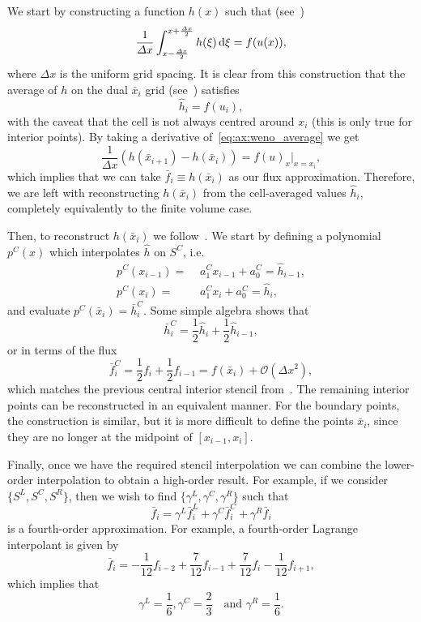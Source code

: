 \documentclass{scrartcl}
\begin{document}
We start by constructing a function $h(x)$ such that (see~\cite[Section 3.2]{Shu2009})
\begin{equation} \label{eq:ax:weno_average}
\frac{1}{\Delta x} \int_{x - \frac{\Delta x}{2}}^{x + \frac{\Delta x}{2}}
    h(\xi) \dx[\xi] = f(u(x)),
\end{equation}
where $\Delta x$ is the uniform grid spacing. It is clear from this construction
that the average of $h$ on the dual $\bar{x}_i$ grid (see~) satisfies
\[
\hat{h}_i = f(u_i),
\]
with the caveat that the cell is not always centred around $x_i$ (this is only
true for interior points). By taking a derivative of~\eqref{eq:ax:weno_average}
we get
\[
\frac{1}{\Delta x} (h(\bar{x}_{i + 1}) - h(\bar{x}_i)) = f(u)_x\Big|_{x = x_i},
\]
which implies that we can take $\bar{f}_i \equiv h(\bar{x}_i)$ as our flux
approximation. Therefore, we are left with reconstructing $h(\bar{x}_i)$ from
the cell-averaged values $\hat{h}_i$, completely equivalently to the finite
volume case.

Then, to reconstruct $h(\bar{x}_i)$ we follow~\cite[Section 2.2]{Shu2009}.
We start by defining a polynomial $p^C(x)$ which interpolates $\hat{h}$ on $S^C$,
i.e.
\[
\begin{aligned}
p^C(x_{i - 1}) =\,\, & a_1^C x_{i - 1} + a_0^C = \hat{h}_{i - 1}, \\
p^C(x_i) =\,\, & a_1^C x_i + a_0^C = \hat{h}_i,
\end{aligned}
\]
and evaluate $p^C(\bar{x}_i) = \bar{h}^{C}_i$. Some simple algebra shows that
\[
\bar{h}^C_i = \frac{1}{2} \hat{h}_i + \frac{1}{2} \hat{h}_{i - 1},
\]
or in terms of the flux
\[
\bar{f}^C_i = \frac{1}{2} f_i + \frac{1}{2} f_{i - 1}
= f(\bar{x}_i) + \mathcal{O}(\Delta x^2),
\]
which matches the previous central interior stencil from~.
The remaining interior points can be reconstructed in an equivalent manner.
For the boundary points, the construction is similar, but it is more difficult
to define the points $\bar{x}_i$, since they are no longer at the midpoint of
$[x_{i - 1}, x_i]$.

Finally, once we have the required stencil interpolation we can combine the
lower-order interpolation to obtain a high-order result. For example, if we
consider $\{S^L, S^C, S^R\}$, then we wish to find $\{\gamma^L, \gamma^C, \gamma^R\}$
such that
\[
\bar{f}_i = \gamma^L \bar{f}^L_i + \gamma^C \bar{f}^C_i + \gamma^R \bar{f}_i
\]
is a fourth-order approximation. For example, a fourth-order Lagrange interpolant
is given by
\[
\bar{f}_i = -\frac{1}{12} f_{i - 2} + \frac{7}{12} f_{i - 1} + \frac{7}{12} f_i - \frac{1}{12} f_{i + 1},
\]
which implies that
\[
\gamma^L = \frac{1}{6},
\gamma^C = \frac{2}{3}
\quad \text{and }
\gamma^R = \frac{1}{6}.
\]
\end{document}
